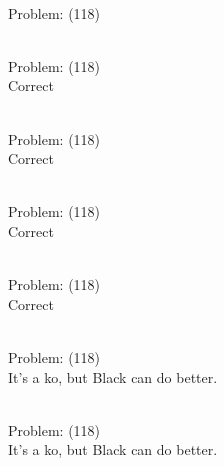 \documentclass[11pt]{article}
\begin{document}
\begin{minipage}[t]{0.5\textwidth}
  {\centering
  
\\
Problem: (118)\\
  }
\end{minipage}
\begin{minipage}[t]{0.5\textwidth}
  {\centering
  
\\
Problem: (118)\\
Correct\\
  }
\end{minipage}
\begin{minipage}[t]{0.5\textwidth}
  {\centering
  
\\
Problem: (118)\\
Correct\\
  }
\end{minipage}
\begin{minipage}[t]{0.5\textwidth}
  {\centering
  
\\
Problem: (118)\\
Correct\\
  }
\end{minipage}
\begin{minipage}[t]{0.5\textwidth}
  {\centering
  
\\
Problem: (118)\\
Correct\\
  }
\end{minipage}
\begin{minipage}[t]{0.5\textwidth}
  {\centering
  
\\
Problem: (118)\\
It's a ko, but Black can do better.\\
  }
\end{minipage}
\begin{minipage}[t]{0.5\textwidth}
  {\centering
  
\\
Problem: (118)\\
It's a ko, but Black can do better.\\
  }
\end{minipage}
\end{document}
